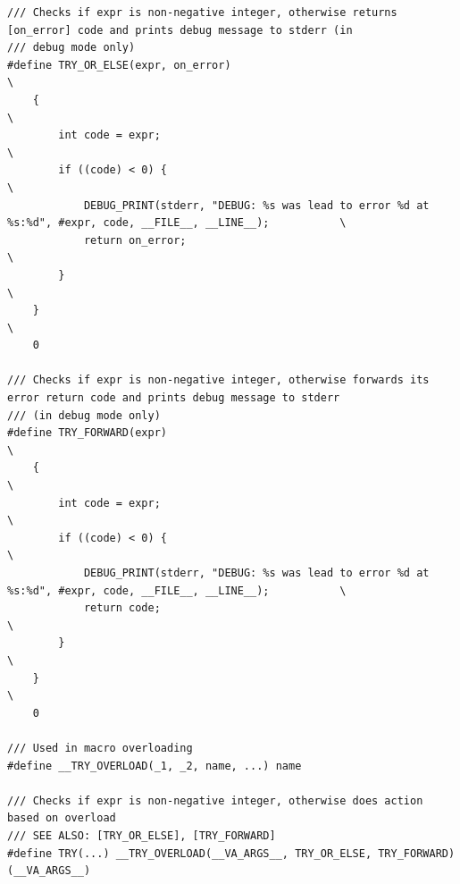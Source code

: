 \begin{verbatim}
/// Checks if expr is non-negative integer, otherwise returns [on_error] code and prints debug message to stderr (in
/// debug mode only)
#define TRY_OR_ELSE(expr, on_error)                                                                                    \
    {                                                                                                                  \
        int code = expr;                                                                                               \
        if ((code) < 0) {                                                                                              \
            DEBUG_PRINT(stderr, "DEBUG: %s was lead to error %d at %s:%d", #expr, code, __FILE__, __LINE__);           \
            return on_error;                                                                                           \
        }                                                                                                              \
    }                                                                                                                  \
    0

/// Checks if expr is non-negative integer, otherwise forwards its error return code and prints debug message to stderr
/// (in debug mode only)
#define TRY_FORWARD(expr)                                                                                              \
    {                                                                                                                  \
        int code = expr;                                                                                               \
        if ((code) < 0) {                                                                                              \
            DEBUG_PRINT(stderr, "DEBUG: %s was lead to error %d at %s:%d", #expr, code, __FILE__, __LINE__);           \
            return code;                                                                                               \
        }                                                                                                              \
    }                                                                                                                  \
    0

/// Used in macro overloading
#define __TRY_OVERLOAD(_1, _2, name, ...) name

/// Checks if expr is non-negative integer, otherwise does action based on overload
/// SEE ALSO: [TRY_OR_ELSE], [TRY_FORWARD]
#define TRY(...) __TRY_OVERLOAD(__VA_ARGS__, TRY_OR_ELSE, TRY_FORWARD)(__VA_ARGS__)


\end{verbatim}
